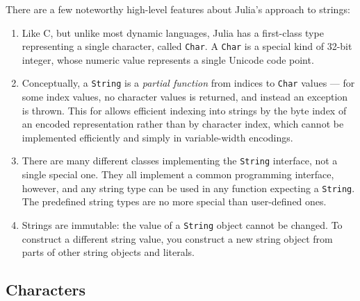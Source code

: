 \documentclass{article}
\begin{document}
There are a few noteworthy high-level features about Julia's approach to strings:
\begin{enumerate}
\item Like C, but unlike most dynamic languages, Julia has a first-class type representing a single character, called \verb|Char|.
A \verb|Char| is a special kind of 32-bit integer, whose numeric value represents a single Unicode code point.
\item Conceptually, a \verb|String| is a \emph{partial function} from indices to \verb|Char| values --- for some index values, no character values is returned, and instead an exception is thrown.
This for allows efficient indexing into strings by the byte index of an encoded representation rather than by character index, which cannot be implemented efficiently and simply in variable-width encodings.
\item There are many different classes implementing the \verb|String| interface, not a single special one.
They all implement a common programming interface, however, and any string type can be used in any function expecting a \verb|String|.
The predefined string types are no more special than user-defined ones.
\item Strings are immutable: the value of a \verb|String| object cannot be changed.
To construct a different string value, you construct a new string object from parts of other string objects and literals.
\end{enumerate}

\subsection{Characters}
\end{document}
